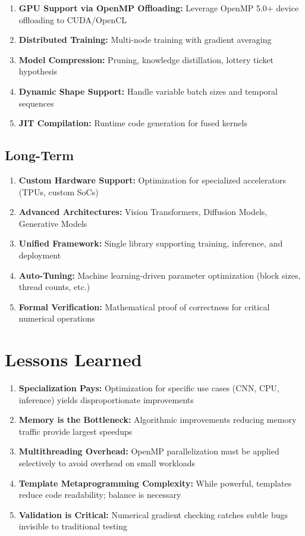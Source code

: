 \documentclass[12pt,oneside,a4paper]{report}
\begin{document}
\begin{enumerate}
    \item \textbf{GPU Support via OpenMP Offloading:} Leverage OpenMP 5.0+ device offloading to CUDA/OpenCL
    \item \textbf{Distributed Training:} Multi-node training with gradient averaging
    \item \textbf{Model Compression:} Pruning, knowledge distillation, lottery ticket hypothesis
    \item \textbf{Dynamic Shape Support:} Handle variable batch sizes and temporal sequences
    \item \textbf{JIT Compilation:} Runtime code generation for fused kernels
\end{enumerate}

\subsection{Long-Term}

\begin{enumerate}
    \item \textbf{Custom Hardware Support:} Optimization for specialized accelerators (TPUs, custom SoCs)
    \item \textbf{Advanced Architectures:} Vision Transformers, Diffusion Models, Generative Models
    \item \textbf{Unified Framework:} Single library supporting training, inference, and deployment
    \item \textbf{Auto-Tuning:} Machine learning-driven parameter optimization (block sizes, thread counts, etc.)
    \item \textbf{Formal Verification:} Mathematical proof of correctness for critical numerical operations
\end{enumerate}

\section{Lessons Learned}

\begin{enumerate}
    \item \textbf{Specialization Pays:} Optimization for specific use cases (CNN, CPU, inference) yields disproportionate improvements
    \item \textbf{Memory is the Bottleneck:} Algorithmic improvements reducing memory traffic provide largest speedups
    \item \textbf{Multithreading Overhead:} OpenMP parallelization must be applied selectively to avoid overhead on small workloads
    \item \textbf{Template Metaprogramming Complexity:} While powerful, templates reduce code readability; balance is necessary
    \item \textbf{Validation is Critical:} Numerical gradient checking catches subtle bugs invisible to traditional testing
\end{enumerate}
\end{document}
